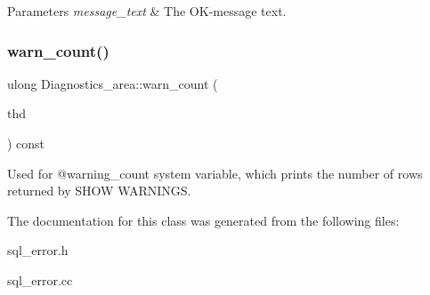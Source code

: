 \begin{DoxyParams}{Parameters}
{\em message\+\_\+text} & The OK-\/message text. \\
\hline
\end{DoxyParams}
\mbox{\label{classDiagnostics__area_add2a21980c4a8b65ccaed96e466976b9}} 
\subsubsection{\texorpdfstring{warn\+\_\+count()}{warn\_count()}}
{\footnotesize\ttfamily ulong Diagnostics\+\_\+area\+::warn\+\_\+count (\begin{DoxyParamCaption}\item[{T\+HD $\ast$}]{thd }\end{DoxyParamCaption}) const}

Used for @warning\+\_\+count system variable, which prints the number of rows returned by S\+H\+OW W\+A\+R\+N\+I\+N\+GS. 

The documentation for this class was generated from the following files\+:\begin{DoxyCompactItemize}
\item 
sql\+\_\+error.\+h\item 
sql\+\_\+error.\+cc\end{DoxyCompactItemize}
